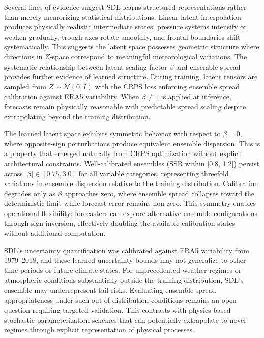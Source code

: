 \documentclass{agujournal2019}
\begin{document}
Several lines of evidence suggest SDL learns structured representations rather than merely memorizing statistical distributions. Linear latent interpolation produces physically realistic intermediate states: pressure systems intensify or weaken gradually, trough axes rotate smoothly, and frontal boundaries shift systematically. This suggests the latent space possesses geometric structure where directions in $Z$-space correspond to meaningful meteorological variations. The systematic relationship between latent scaling factor $\beta$ and ensemble spread provides further evidence of learned structure. During training, latent tensors are sampled from $Z \sim \mathcal{N}(0, I)$ with the CRPS loss enforcing ensemble spread calibration against ERA5 variability. When $\beta \neq 1$ is applied at inference, forecasts remain physically reasonable with predictable spread scaling despite extrapolating beyond the training distribution.

The learned latent space exhibits symmetric behavior with respect to $\beta = 0$, where opposite-sign perturbations produce equivalent ensemble dispersion. This is a property that emerged naturally from CRPS optimization without explicit architectural constraints. Well-calibrated ensembles (SSR within [0.8, 1.2]) persist across $|\beta| \in [0.75, 3.0]$ for all variable categories, representing threefold variations in ensemble dispersion relative to the training distribution. Calibration degrades only as $\beta$ approaches zero, where ensemble spread collapses toward the deterministic limit while forecast error remains non-zero. This symmetry enables operational flexibility: forecasters can explore alternative ensemble configurations through sign inversion, effectively doubling the available calibration states without additional computation.

SDL's uncertainty quantification was calibrated against ERA5 variability from 1979–2018, and these learned uncertainty bounds may not generalize to other time periods or future climate states. For unprecedented weather regimes or atmospheric conditions substantially outside the training distribution, SDL's ensemble may underrepresent tail risks. Evaluating ensemble spread appropriateness under such out-of-distribution conditions remains an open question requiring targeted validation. This contrasts with physics-based stochastic parameterization schemes that can potentially extrapolate to novel regimes through explicit representation of physical processes.
\end{document}
